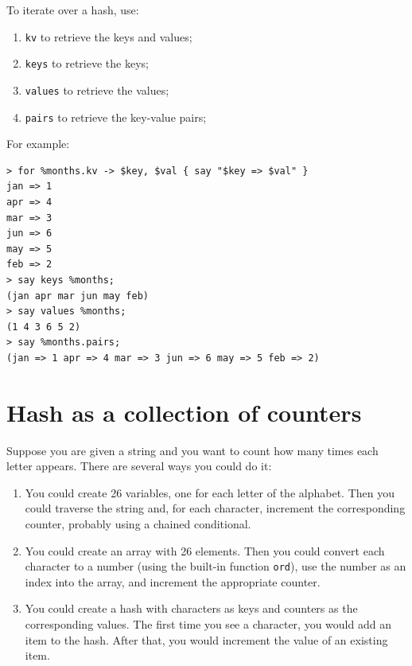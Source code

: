 To iterate over a hash, use:

\begin{enumerate}
\item {\tt kv} to retrieve the keys and values;
\item {\tt keys} to retrieve the keys;
\item {\tt values} to retrieve the values;
\item {\tt pairs} to retrieve the key-value pairs;
\end{enumerate}

For example:

\begin{verbatim}
> for %months.kv -> $key, $val { say "$key => $val" }
jan => 1
apr => 4
mar => 3
jun => 6
may => 5
feb => 2
> say keys %months;
(jan apr mar jun may feb)
> say values %months;
(1 4 3 6 5 2)
> say %months.pairs;
(jan => 1 apr => 4 mar => 3 jun => 6 may => 5 feb => 2)
\end{verbatim}
%

\section{Hash as a collection of counters}
\label{histogram}

Suppose you are given a string and you want to count how many
times each letter appears.  There are several ways you could do it:

\begin{enumerate}

\item You could create 26 variables, one for each letter of the
alphabet.  Then you could traverse the string and, for each
character, increment the corresponding counter, probably using
a chained conditional.

\item You could create an array with 26 elements.  Then you could
convert each character to a number (using the built-in function
{\tt ord}), use the number as an index into the array, and 
increment the appropriate counter.

\item You could create a hash with characters as keys
and counters as the corresponding values.  The first time you
see a character, you would add an item to the hash.  After
that, you would increment the value of an existing item.

\end{enumerate}

